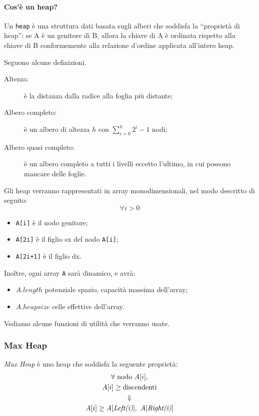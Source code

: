 \paragraph{Cos'è un heap?} Un \texttt{heap} è una struttura dati basata sugli alberi che
soddisfa la ``proprietà di heap'': se A è un genitore di B, allora la chiave di A è ordinata rispetto
alla chiave di B conformemente alla relazione d'ordine applicata all'intero heap.\par
Seguono alcune definizioni.
\begin{description}
	\item[Altezza:] è la distanza dalla radice alla foglia più distante;
	\item[Albero completo:] è un albero di altezza $h$ con $\displaystyle\sum_{i=0}^h 2^i - 1$ nodi;
	\item[Albero quasi completo:] è un albero completo a tutti i livelli eccetto l'ultimo, in cui 
	possono mancare delle foglie.
\end{description}

Gli heap verranno rappresentati in array monodimensionali, nel modo descritto di seguito:
$$\forall i > 0 $$
\begin{itemize}
	\item \texttt{A[i]} è il nodo genitore;
	\item \texttt{A[2i]} è il figlio sx del nodo \texttt{A[i]};
	\item \texttt{A[2i+1]} è il figlio dx.
\end{itemize}
Inoltre, ogni array \texttt{A} sarà dinamico, e avrà:
\begin{itemize}
	\item $A.length$ potenziale spazio, capacità massima dell'array;
	\item $A.heapsize$ celle effettive dell'array.
\end{itemize}

Vediamo alcune funzioni di utilità che verranno usate.




\subsubsection{Max Heap}
\emph{Max Heap} è uno heap che soddisfa la seguente proprietà:
\begin{gather*}
	\forall \text{ nodo } A[i], \\
	A[i] \geq \text{discendenti} \\
	\Downarrow \\
	A[i] \geq A[\text{\emph{Left(i)}}], \ A[\text{\emph{Right(i)}}]
\end{gather*}
